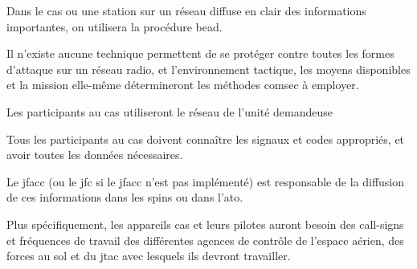 \begin{e1}
{\begin{e2}
{				Dans le cas ou une station sur un réseau diffuse en clair des informations importantes, on utilisera la procédure \gls{bead}.
			}
			
		\end{e2}
		
		Il n'existe aucune technique permettent de se protéger contre toutes les formes d'attaque sur un réseau radio, et l'environnement tactique, les moyens disponibles et la mission elle-même détermineront les méthodes \gls{comsec} à employer.
		
		

	}
	
	
	\begin{e2}
		
		\item Les participants au \gls{cas} utiliseront le réseau de l'unité demandeuse
		
		\item Tous les participants au \gls{cas} doivent connaître les signaux et codes appropriés, et avoir toutes les données nécessaires.
		
		Le \gls{jfacc} (ou le \gls{jfc} si le \gls{jfacc} n'est pas implémenté) est responsable de la diffusion de ces informations dans les \gls{spins} ou dans l'\gls{ato}.
		
		\item Plus spécifiquement, les appareils \gls{cas} et leurs pilotes auront besoin des call-signs et fréquences de travail des différentes agences de contrôle de l'espace aérien, des forces au sol et du \gls{jtac} avec lesquels ils devront travailler.
	\end{e2}
	
	

\end{e1}
